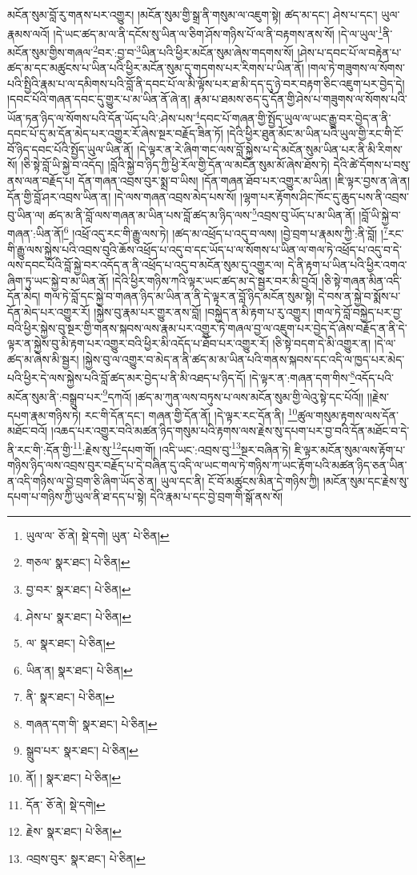 མངོན་སུམ་བློ་རུ་གནས་པར་འགྱུར། །མངོན་སུམ་གྱི་སྒྲ་ནི་གསུམ་ལ་འཇུག་སྟེ། ཚད་མ་དང་། ཤེས་པ་དང་། ཡུལ་རྣམས་ལའོ། །དེ་ཡང་ཚད་མ་ལ་ནི་དངོས་སུ་ཡིན་ལ་ཅིག་ཤོས་གཉིས་པོ་ལ་ནི་བརྟགས་ནས་སོ། །དེ་ལ་ཡུལ་\footnote{ཡུལ་ལ་  ཅོ་ནེ།  སྡེ་དགེ། ཡུན་  པེ་ཅིན། }ནི་མངོན་སུམ་གྱིས་གཞལ་\footnote{གཅལ་  སྣར་ཐང་།  པེ་ཅིན། }བར་:བྱ་བ་\footnote{བྱ་བར་  སྣར་ཐང་།  པེ་ཅིན། }ཡིན་པའི་ཕྱིར་མངོན་སུམ་ཞེས་གདགས་སོ། །ཤེས་པ་དབང་པོ་ལ་བརྟེན་པ་ཚད་མ་དང་མཚུངས་པ་ཡིན་པའི་ཕྱིར་མངོན་སུམ་དུ་གདགས་པར་རིགས་པ་ཡིན་ནོ། །གལ་ཏེ་གཟུགས་ལ་སོགས་པའི་སྤྱིའི་རྣམ་པ་ལ་དམིགས་པའི་བློ་ནི་དབང་པོ་ལ་མི་ལྟོས་པར་ཐ་མི་དད་དུ་ཉེ་བར་བརྟག་ཅིང་འཇུག་པར་བྱེད་དེ། །དབང་པོའི་གཞན་དབང་དུ་གྱུར་པ་མ་ཡིན་ནོ་ཞེ་ན། རྣམ་པ་ཐམས་ཅད་དུ་དོན་གྱི་ཤེས་པ་གཟུགས་ལ་སོགས་པའི་ཡོན་ཏན་ཉིད་ལ་སོགས་པའི་དོན་ཡོད་པའི་:ཤེས་པས་\footnote{ཤེས་པ་  སྣར་ཐང་།  པེ་ཅིན། }དབང་པོ་གཞན་གྱི་སྤྱོད་ཡུལ་ལ་ཡང་རྒྱུ་བར་བྱེད་ན་ནི་དབང་པོ་དུ་མ་དོན་མེད་པར་འགྱུར་རོ་ཞེས་སྔར་བརྗོད་ཟིན་ཏོ། །དེའི་ཕྱིར་ཐུན་མོང་མ་ཡིན་པའི་ཡུལ་གྱི་རང་གི་ངོ་བོ་ཉིད་དབང་པོའི་སྤྱོད་ཡུལ་ཡིན་ནོ། །དེ་ལྟར་ན་རེ་ཞིག་གང་ལས་བློ་སྐྱེས་པ་དེ་མངོན་སུམ་ཡིན་པར་ནི་མི་རིགས་སོ། །ཅི་སྟེ་བློ་ཡི་སྐྱེ་བ་འདོད། །བློའི་སྐྱེ་བ་ཉིད་ཀྱི་ཕྱི་རོལ་གྱི་དོན་ལ་མངོན་སུམ་མོ་ཞེས་ཐོས་ཏེ། དེའི་ཚེ་དོགས་པ་བསུ་ནས་ལན་བརྗོད་པ། དོན་གཞན་འབྲས་བུར་སྨྲ་བ་ཡིས། །དོན་གཞན་ཐོབ་པར་འགྱུར་མ་ཡིན། །ཇི་ལྟར་བྱས་ན་ཞེ་ན། དོན་གྱི་བློ་ཤར་འབྲས་ཡིན་ན། །དེ་ལས་གཞན་འབྲས་མེད་པས་སོ། །ལྷག་པར་རྟོགས་ཤིང་ཁོང་དུ་ཆུད་པས་ནི་འབྲས་བུ་ཡིན་ལ། ཚད་མ་ནི་བློ་ལས་གཞན་མ་ཡིན་པས་བློ་ཚད་མ་ཉིད་ལས་\footnote{ལ་  སྣར་ཐང་།  པེ་ཅིན། }འབྲས་བུ་ཡོད་པ་མ་ཡིན་ནོ། །བློ་ཡི་སྐྱེ་བ་གཞན་:ཡིན་ནོ།\footnote{ཡིན་ན།  སྣར་ཐང་།  པེ་ཅིན། } །འཕྲོ་འདུ་རང་གི་རྒྱུ་ལས་ཏེ། །ཚད་མ་འཕྲོད་པ་འདུ་བ་ལས། །བྱེ་བྲག་པ་རྣམས་ཀྱི་:ནི་བློ། །\footnote{ནི་  སྣར་ཐང་།  པེ་ཅིན། }རང་གི་རྒྱུ་ལས་སྐྱེས་པའི་འབྲས་བུའི་ཆོས་འཕྲོད་པ་འདུ་བ་དང་ཡོད་པ་ལ་སོགས་པ་ཡིན་ལ་གལ་ཏེ་འཕྲོད་པ་འདུ་བ་དེ་ལས་དབང་པོའི་བློ་སྐྱེ་བར་འདོད་ན་ནི་འཕྲོད་པ་འདུ་བ་མངོན་སུམ་དུ་འགྱུར་ལ། དེ་ནི་རྟག་པ་ཡིན་པའི་ཕྱིར་འགའ་ཞིག་ཏུ་ཡང་སྐྱེ་བ་མ་ཡིན་ནོ། །དེའི་ཕྱིར་གཉིས་ཀའི་ལྟར་ཡང་ཚད་མ་དེ་སྦྱར་བར་མི་བྱའོ། །ཅི་སྟེ་གཞན་མིན་འདི་དོན་མེད། གལ་ཏེ་བློ་དང་སྐྱེ་བ་གཞན་ཉིད་མ་ཡིན་ན་ནི་དེ་ལྟར་ན་བློ་ཉིད་མངོན་སུམ་སྟེ། དེ་བས་ན་སྐྱེ་བ་སྨོས་པ་དོན་མེད་པར་འགྱུར་རོ། །སྐྱེས་བུ་རྣམ་པར་གྱུར་ནས་བློ། །བསྐྱེད་ན་མི་རྟག་པ་རུ་འགྱུར། །གལ་ཏེ་བློ་བསྐྱེད་པར་བྱ་བའི་ཕྱིར་སྐྱེས་བུ་སྔར་གྱི་གནས་སྐབས་ལས་རྣམ་པར་འགྱུར་ཏེ་གཞལ་བྱ་ལ་འཇུག་པར་བྱེད་དོ་ཞེས་བརྗོད་ན་ནི་དེ་ལྟར་ན་སྐྱེས་བུ་མི་རྟག་པར་འགྱུར་བའི་ཕྱིར་མི་འདོད་པ་ཐོབ་པར་འགྱུར་རོ། །ཅི་སྟེ་བདག་དེ་མི་འགྱུར་ན། །དེ་ལ་ཚད་མ་ཞེས་མི་སྦྱར། །སྐྱེས་བུ་ལ་འགྱུར་བ་མེད་ན་ནི་ཚད་མ་མ་ཡིན་པའི་གནས་སྐབས་དང་འདི་ལ་ཁྱད་པར་མེད་པའི་ཕྱིར་དེ་ལས་སྐྱེས་པའི་བློ་ཚད་མར་བྱེད་པ་ནི་མི་འཐད་པ་ཉིད་དོ། །དེ་ལྟར་ན་:གཞན་དག་གིས་\footnote{གཞན་དག་གི་  སྣར་ཐང་།  པེ་ཅིན། }འདོད་པའི་མངོན་སུམ་ནི་:བསྒྲུབ་པར་\footnote{སྒྲུབ་པར་  སྣར་ཐང་།  པེ་ཅིན། }དཀའོ། །ཚད་མ་ཀུན་ལས་བཏུས་པ་ལས་མངོན་སུམ་གྱི་ལེའུ་སྟེ་དང་པོའོ།། །།རྗེས་དཔག་རྣམ་གཉིས་ཏེ། རང་གི་དོན་དང་། གཞན་གྱི་དོན་ནོ། །དེ་ལྟར་རང་དོན་ནི། \footnote{ནོ། །   སྣར་ཐང་།  པེ་ཅིན། }ཚུལ་གསུམ་རྟགས་ལས་དོན་མཐོང་བའོ། །འཆད་པར་འགྱུར་བའི་མཚན་ཉིད་གསུམ་པའི་རྟགས་ལས་རྗེས་སུ་དཔག་པར་བྱ་བའི་དོན་མཐོང་བ་དེ་ནི་རང་གི་:དོན་གྱི་\footnote{དོན་  ཅོ་ནེ།  སྡེ་དགེ། }:རྗེས་སུ་\footnote{རྗེས་  སྣར་ཐང་།  པེ་ཅིན། }དཔག་གོ། །འདི་ཡང་:འབྲས་བུ་\footnote{འབྲས་བུར་  སྣར་ཐང་།  པེ་ཅིན། }སྔར་བཞིན་ཏེ། ཇི་ལྟར་མངོན་སུམ་ལས་རྟོག་པ་གཉིས་ཉིད་ལས་འབྲས་བུར་བརྗོད་པ་དེ་བཞིན་དུ་འདི་ལ་ཡང་གལ་ཏེ་གཉིས་ཀ་ཡང་རྟོག་པའི་མཚན་ཉིད་ཅན་ཡིན་ན་འདི་གཉིས་ལ་བྱེ་བྲག་ཅི་ཞིག་ཡོད་ཅེ་ན། ཡུལ་དང་ནི། ངོ་བོ་མཚུངས་མིན་དེ་གཉིས་ཀྱི། །མངོན་སུམ་དང་རྗེས་སུ་དཔག་པ་གཉིས་ཀྱི་ཡུལ་ནི་ཐ་དད་པ་སྟེ། དེའི་རྣམ་པ་དང་བྱེ་བྲག་གི་སྒོ་ནས་སོ། 